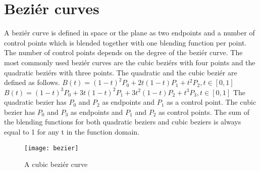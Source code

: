 \section{Beziér curves}\label{bezier}
A beziér curve is defined in space or the plane as two endpoints and a number of control points which is blended together with one blending function per point. The number of control points depends on the degree of the beziér curve. The most commonly used beziér curves are the cubic beziérs with four points and the quadratic beziérs with three points. The quadratic and the cubic beziér are defined as follows.\vspace{\baselineskip}\newline
\begin{math}
B(t) = (1-t)^2P_0+2t(1-t)P_1+t^2P_2, t\in[0, 1] 
\end{math} \vspace{\baselineskip}\newline
\begin{math}
B(t) = (1 - t)^3P_0 + 3t(1 - t)^2P_1 + 3t^2(1 - t)P_2 + t^3P_3, t\in[0, 1]
\end{math} \vspace{\baselineskip}\newline
The quadratic bezier has $P_0$ and $P_2$ as endpoints and $P_1$ as a control point. The cubic bezier has $P_0$ and $P_3$ as endpoints and $P_1$ and $P_2$ as control points. The sum of the blending functions for both quadratic beziers and cubic beziers is always equal to 1 for any t in the function domain.\citep{PFNP}

\begin{figure}[H]
\texttt{[image: bezier]}
\caption{A cubic beziér curve}
\end{figure}

